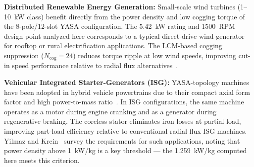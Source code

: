 \documentclass[12pt,a4paper]{article}
\begin{document}
\textbf{Distributed Renewable Energy Generation:} Small-scale wind turbines (1--10~kW class) benefit directly from the power density and low cogging torque of the 8-pole/12-slot YASA configuration. The 5.42~kW rating and 1500~RPM design point analyzed here corresponds to a typical direct-drive wind generator for rooftop or rural electrification applications. The LCM-based cogging suppression ($N_{\text{cog}} = 24$) reduces torque ripple at low wind speeds, improving cut-in speed performance relative to radial flux alternatives~\cite{ref9,ref33}.

\textbf{Vehicular Integrated Starter-Generators (ISG):} YASA-topology machines have been adopted in hybrid vehicle powertrains due to their compact axial form factor and high power-to-mass ratio~\cite{ref36}. In ISG configurations, the same machine operates as a motor during engine cranking and as a generator during regenerative braking. The coreless stator eliminates iron losses at partial load, improving part-load efficiency relative to conventional radial flux ISG machines. Yilmaz and Krein~\cite{ref33} survey the requirements for such applications, noting that power density above 1~kW/kg is a key threshold — the 1.259~kW/kg computed here meets this criterion.
\end{document}
